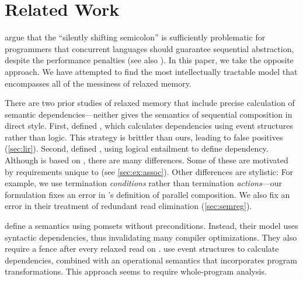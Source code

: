 \section{Related Work}
\label{sec:related}

\citet{DBLP:conf/snapl/MarinoMMNS15} argue that the ``silently shifting
semicolon'' is sufficiently problematic for programmers that concurrent
languages should guarantee sequential abstraction, despite the performance
penalties (see also \citet{10.1145/3462206}).  In this paper, we take the
opposite approach.  We have attempted to find the most intellectually
tractable model that encompasses all of the messiness of relaxed memory.

There are two prior studies of relaxed memory that include precise
calculation of semantic dependencies---neither gives the semantics of
sequential composition in direct style.
First, \citet{DBLP:conf/esop/PaviottiCPWOB20} defined \MRD{}, which calculates
dependencies using event structures rather than logic.  This strategy is
brittler than ours, leading to false positives (\textsection\ref{sec:lir}).
Second, \citet{DBLP:journals/pacmpl/JagadeesanJR20} defined \PwP{}, using logical
entailment to define dependency.  Although \PwT{} is based on \PwP{}, there
are many differences.
Some of these are motivated by requirements unique to
\PwT{} (see \textsection\ref{sec:ex:assoc}).
Other differences are stylistic: For
example, we use termination \emph{conditions} rather than termination
\emph{actions}---our formulation fixes an error in
\citeauthor{DBLP:journals/pacmpl/JagadeesanJR20}'s definition of parallel
composition.  We also fix an error in their treatment of redundant read
elimination (\textsection\ref{sec:semreg}).

\citet{DBLP:journals/corr/abs-1804-04214} define a semantics
using pomsets without preconditions. Instead, their model uses syntactic
dependencies, thus invalidating many compiler optimizations.  They also
require a fence after every relaxed read on \armeight{}.
%
\citet{Pichon-Pharabod:2016:CSR:2837614.2837616} use event structures to
calculate dependencies, combined with an operational semantics that
incorporates program transformations.  This approach seems to require
whole-program analysis.




